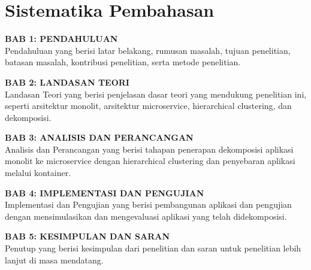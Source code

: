 \section{Sistematika Pembahasan}
\textbf{BAB 1: PENDAHULUAN} \\
Pendahuluan yang berisi latar belakang, rumusan masalah, tujuan penelitian, batasan masalah, kontribusi penelitian, serta metode penelitian.

\textbf{BAB 2: LANDASAN TEORI}\\
Landasan Teori yang berisi penjelasan dasar teori yang mendukung penelitian ini, seperti arsitektur monolit, arsitektur microservice, hierarchical clustering, dan dekomposisi.

\textbf{BAB 3: ANALISIS DAN PERANCANGAN}\\
Analisis dan Perancangan yang berisi tahapan penerapan dekomposisi aplikasi monolit ke microservice dengan hierarchical clustering dan penyebaran aplikasi melalui kontainer.

\textbf{BAB 4: IMPLEMENTASI DAN PENGUJIAN}\\
Implementasi dan Pengujian yang berisi pembangunan aplikasi dan pengujian dengan mensimulasikan dan mengevaluasi aplikasi yang telah didekomposisi.

\textbf{BAB 5: KESIMPULAN DAN SARAN}\\
Penutup yang berisi kesimpulan dari penelitian dan saran untuk penelitian lebih lanjut di masa mendatang.